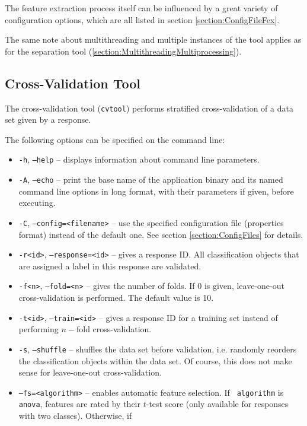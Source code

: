 The feature extraction process itself can be influenced by a great variety of
configuration options, which are all listed in section
\ref{section:ConfigFileFex}.

The same note about multithreading and multiple instances of the tool applies as
for the separation tool (\ref{section:MultithreadingMultiprocessing}).


\subsection{Cross-Validation Tool}

The cross-validation tool ({\tt cvtool}) performs stratified cross-validation of
a data set given by a response.

\noindent The following options can be specified on the command line:
\begin{itemize}
  \item {\tt -h}, {\tt --help} -- displays information about command line
    parameters.
  \item {\tt -A}, {\tt --echo} -- print the base name of the application binary
    and its named command line options in long format, with their parameters if 
    given, before executing.
  \item {\tt -C}, {\tt --config=<filename>} -- use the specified configuration
    file (properties format) instead of the default one. See section 
    \ref{section:ConfigFiles} for details.
  \item {\tt -r<id>}, {\tt --response=<id>} -- gives a response ID. All
    classification objects that are assigned a label in this response are
    validated.
  \item {\tt -f<n>}, {\tt --fold=<n>} -- gives the number of folds. If 0 is
    given, leave-one-out cross-validation is performed. The default value is
    10.
  \item {\tt -t<id>}, {\tt --train=<id>} -- gives a response ID for a
    training set instead of performing $n-$fold cross-validation.
  \item {\tt -s}, {\tt --shuffle} -- shuffles the data set before validation,
    i.e. randomly reorders the classification objects within the data set. Of
    course, this does not make sense for leave-one-out cross-validation.
  \item {\tt --fs=<algorithm>} -- enables automatic feature selection. If {\tt
      algorithm} is {\tt anova}, features are rated by their $t$-test score
    (only available for responses with two classes).  Otherwise, if {\tt
}
\end{itemize}
